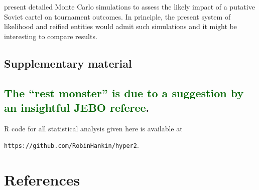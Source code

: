 \documentclass[review]{elsarticle}
\begin{document}
\cite{moul2009} present detailed Monte Carlo simulations to assess the
likely impact of a putative Soviet cartel on tournament outcomes.  In
principle, the present system of likelihood and reified entities would
admit such simulations and it might be interesting to compare results.



\subsection*{Supplementary material}

\subsection*{\textcolor{DarkGreen}{The ``rest monster'' is due to a suggestion by an insightful JEBO referee}.}

R code for all statistical analysis given here is available at

{\tt https://github.com/RobinHankin/hyper2}.

\section*{References}


\end{document}
